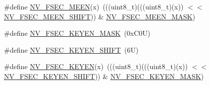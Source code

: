 \begin{DoxyCompactItemize}
\item 
\#define \mbox{\hyperlink{group___n_v___register___masks_ga6a3e909b41d8dd2ca5f55b10e8cc4e52}{N\+V\+\_\+\+F\+S\+E\+C\+\_\+\+M\+E\+EN}}(x)~(((uint8\+\_\+t)(((uint8\+\_\+t)(x)) $<$$<$ \mbox{\hyperlink{group___n_v___register___masks_ga13adfbdf46af9e59b446d17ce90b49c1}{N\+V\+\_\+\+F\+S\+E\+C\+\_\+\+M\+E\+E\+N\+\_\+\+S\+H\+I\+FT}})) \& \mbox{\hyperlink{group___n_v___register___masks_ga02f5aa86e1f5bceefd0378fa736d5656}{N\+V\+\_\+\+F\+S\+E\+C\+\_\+\+M\+E\+E\+N\+\_\+\+M\+A\+SK}})
\item 
\#define \mbox{\hyperlink{group___n_v___register___masks_ga50a87e963eeaaf5fdb904e7bac9099af}{N\+V\+\_\+\+F\+S\+E\+C\+\_\+\+K\+E\+Y\+E\+N\+\_\+\+M\+A\+SK}}~(0x\+C0\+U)
\item 
\#define \mbox{\hyperlink{group___n_v___register___masks_ga3df55e24a4dc42a19afc15b4a3137bae}{N\+V\+\_\+\+F\+S\+E\+C\+\_\+\+K\+E\+Y\+E\+N\+\_\+\+S\+H\+I\+FT}}~(6\+U)
\item 
\#define \mbox{\hyperlink{group___n_v___register___masks_gaca6379e60e0371d1d0c8493abe9db870}{N\+V\+\_\+\+F\+S\+E\+C\+\_\+\+K\+E\+Y\+EN}}(x)~(((uint8\+\_\+t)(((uint8\+\_\+t)(x)) $<$$<$ \mbox{\hyperlink{group___n_v___register___masks_ga3df55e24a4dc42a19afc15b4a3137bae}{N\+V\+\_\+\+F\+S\+E\+C\+\_\+\+K\+E\+Y\+E\+N\+\_\+\+S\+H\+I\+FT}})) \& \mbox{\hyperlink{group___n_v___register___masks_ga50a87e963eeaaf5fdb904e7bac9099af}{N\+V\+\_\+\+F\+S\+E\+C\+\_\+\+K\+E\+Y\+E\+N\+\_\+\+M\+A\+SK}})
\end{DoxyCompactItemize}
